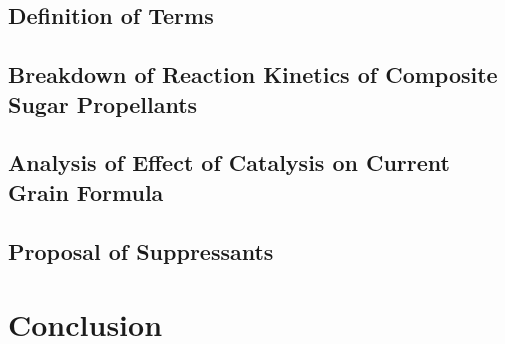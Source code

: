 \documentclass[12pt,letterpaper]{article}
\begin{document}
        \subsection{Definition of Terms}
            \lipsum[1]
            \subsection{Breakdown of Reaction Kinetics of Composite Sugar Propellants}
                    \lipsum[1-3]
        \subsection{Analysis of Effect of Catalysis on Current Grain Formula}
            \lipsum[1]
        \subsection{Proposal of Suppressants}

    \section{Conclusion}
\end{document}
